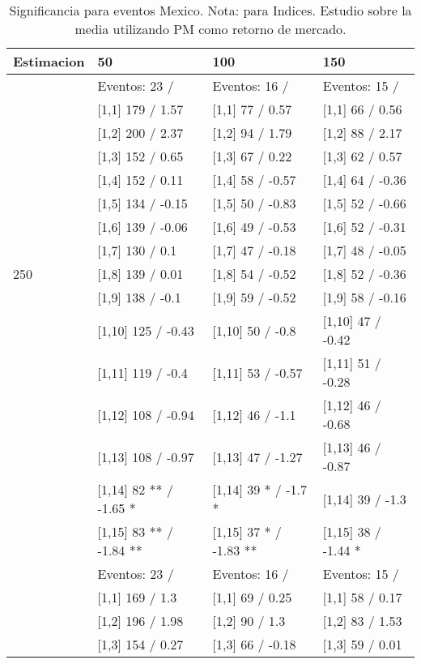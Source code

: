\begin{table}

\caption{Significancia para eventos Mexico. Nota: para Indices. Estudio sobre la media utilizando PM como retorno de mercado.}
\centering
\begin{tabular}[t]{llll}
\toprule
Estimacion & 50 & 100 & 150\\
\midrule
 & Eventos:  23 / & Eventos:  16 / & Eventos:  15 /\\
 & {}[1,1] 179  / 1.57 & {}[1,1] 77  / 0.57 & {}[1,1] 66  / 0.56\\
 & {}[1,2] 200  / 2.37 & {}[1,2] 94  / 1.79 & {}[1,2] 88  / 2.17\\
 & {}[1,3] 152  / 0.65 & {}[1,3] 67  / 0.22 & {}[1,3] 62  / 0.57\\
 & {}[1,4] 152  / 0.11 & {}[1,4] 58  / -0.57 & {}[1,4] 64  / -0.36\\
\addlinespace
 & {}[1,5] 134  / -0.15 & {}[1,5] 50  / -0.83 & {}[1,5] 52  / -0.66\\
 & {}[1,6] 139  / -0.06 & {}[1,6] 49  / -0.53 & {}[1,6] 52  / -0.31\\
 & {}[1,7] 130  / 0.1 & {}[1,7] 47  / -0.18 & {}[1,7] 48  / -0.05\\
250 & {}[1,8] 139  / 0.01 & {}[1,8] 54  / -0.52 & {}[1,8] 52  / -0.36\\
 & {}[1,9] 138  / -0.1 & {}[1,9] 59  / -0.52 & {}[1,9] 58  / -0.16\\
\addlinespace
 & {}[1,10] 125  / -0.43 & {}[1,10] 50  / -0.8 & {}[1,10] 47  / -0.42\\
 & {}[1,11] 119  / -0.4 & {}[1,11] 53  / -0.57 & {}[1,11] 51  / -0.28\\
 & {}[1,12] 108  / -0.94 & {}[1,12] 46  / -1.1 & {}[1,12] 46  / -0.68\\
 & {}[1,13] 108  / -0.97 & {}[1,13] 47  / -1.27 & {}[1,13] 46  / -0.87\\
 & {}[1,14] 82 ** / -1.65 * & {}[1,14] 39 * / -1.7 * & {}[1,14] 39  / -1.3\\
\addlinespace
 & {}[1,15] 83 ** / -1.84 ** & {}[1,15] 37 * / -1.83 ** & {}[1,15] 38  / -1.44 *\\
 & Eventos:  23 / & Eventos:  16 / & Eventos:  15 /\\
 & {}[1,1] 169  / 1.3 & {}[1,1] 69  / 0.25 & {}[1,1] 58  / 0.17\\
 & {}[1,2] 196  / 1.98 & {}[1,2] 90  / 1.3 & {}[1,2] 83  / 1.53\\
 & {}[1,3] 154  / 0.27 & {}[1,3] 66  / -0.18 & {}[1,3] 59  / 0.01\\

\end{tabular}
\end{table}
